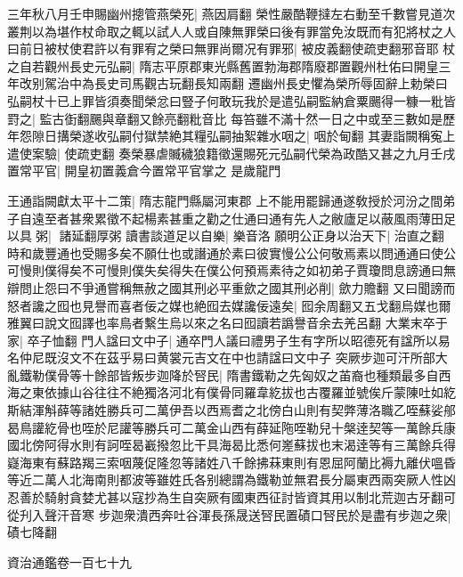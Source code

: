三年秋八月壬申賜幽州摠管燕榮死|{
	燕因肩翻}
榮性嚴酷鞭撻左右動至千數嘗見道次叢荆以為堪作杖命取之輒以試人人或自陳無罪榮曰後有罪當免汝既而有犯將杖之人曰前日被杖使君許以有罪宥之榮曰無罪尚爾况有罪邪|{
	被皮義翻使疏吏翻邪音耶}
杖之自若觀州長史元弘嗣|{
	隋志平原郡東光縣舊置勃海郡隋廢郡置觀州杜佑曰開皇三年改别駕治中為長史司馬觀古玩翻長知兩翻}
遷幽州長史懼為榮所辱固辭上勅榮曰弘嗣杖十已上罪皆須奏聞榮忿曰豎子何敢玩我於是遣弘嗣監納倉粟颺得一糠一粃皆罸之|{
	監古衘翻颺與章翻又餘亮翻粃音比}
每笞雖不滿十然一日之中或至三數如是歷年怨隙日搆榮遂收弘嗣付獄禁絶其糧弘嗣抽絮雜水咽之|{
	咽於甸翻}
其妻詣闕稱寃上遣使案驗|{
	使疏吏翻}
奏榮暴虐贓穢狼籍徵還賜死元弘嗣代榮為政酷又甚之九月壬戌置常平官|{
	開皇初置義倉今置常平官掌之}
是歲龍門

王通詣闕獻太平十二策|{
	隋志龍門縣屬河東郡}
上不能用罷歸通遂敎授於河汾之間弟子自遠至者甚衆累徵不起楊素甚重之勸之仕通曰通有先人之敝廬足以蔽風雨薄田足以具粥|{
	諸延翻厚粥}
讀書談道足以自樂|{
	樂音洛}
願明公正身以治天下|{
	治直之翻}
時和歲豐通也受賜多矣不願仕也或譖通於素曰彼實慢公公何敬焉素以問通通曰使公可慢則僕得矣不可慢則僕失矣得失在僕公何預焉素待之如初弟子賈瓊問息謗通曰無辯問止怨曰不爭通嘗稱無赦之國其刑必平重歛之國其刑必削|{
	歛力贍翻}
又曰聞謗而怒者讒之囮也見譽而喜者佞之媒也絶囮去媒讒佞遠矣|{
	囮余周翻又五戈翻烏媒也爾雅翼曰說文囮譯也率鳥者繫生烏以來之名曰囮讀若譌譽音余去羌呂翻}
大業末卒于家|{
	卒子恤翻}
門人諡曰文中子|{
	通卒門人議曰禮男子生有字所以昭德死有諡所以易名仲尼既沒文不在茲乎易曰黄裳元吉文在中也請諡曰文中子}
突厥步迦可汗所部大亂鐵勒僕骨等十餘部皆叛步迦降於唘民|{
	隋書鐵勒之先匈奴之苖裔也種類最多自西海之東依據山谷往往不絶獨洛河北有僕骨同羅韋紇拔也古覆羅並號俟斤蒙陳吐如紇斯結渾斛薛等諸姓勝兵可二萬伊吾以西焉耆之北傍白山則有契弊薄洛職乙咥蘇娑郍曷鳥讙紇骨也咥於尼讙等勝兵可二萬金山西有薛延陁咥勒兒十槃逹契等一萬餘兵康國北傍阿得水則有訶咥曷嶻撥忽比干具海曷比悉何嵳蘇拔也末渴逹等有三萬餘兵得嶷海東有蘇路羯三索咽蔑促隆忽等諸姓八千餘拂菻東則有恩屈阿蘭比褥九離伏嗢昏等近二萬人北海南則都波等雖姓氏各别總謂為鐵勒並無君長分屬東西兩突厥人性凶忍善於騎射貪婪尤甚以寇抄為生自突厥有國東西征討皆資其用以制北荒迦古牙翻可從刋入聲汗音寒}
步迦衆潰西奔吐谷渾長孫晟送唘民置磧口唘民於是盡有步迦之衆|{
	磧七降翻}


資治通鑑卷一百七十九
